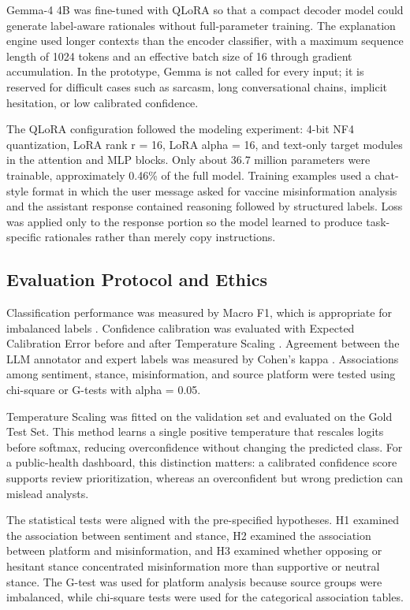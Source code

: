 \documentclass[runningheads]{llncs}
\begin{document}
Gemma-4 4B was fine-tuned with QLoRA so that a compact decoder model could generate label-aware rationales without full-parameter training. The explanation engine used longer contexts than the encoder classifier, with a maximum sequence length of 1024 tokens and an effective batch size of 16 through gradient accumulation. In the prototype, Gemma is not called for every input; it is reserved for difficult cases such as sarcasm, long conversational chains, implicit hesitation, or low calibrated confidence.

The QLoRA configuration followed the modeling experiment: 4-bit NF4 quantization, LoRA rank r = 16, LoRA alpha = 16, and text-only target modules in the attention and MLP blocks. Only about 36.7 million parameters were trainable, approximately 0.46\% of the full model. Training examples used a chat-style format in which the user message asked for vaccine misinformation analysis and the assistant response contained reasoning followed by structured labels. Loss was applied only to the response portion so the model learned to produce task-specific rationales rather than merely copy instructions.

\subsection{Evaluation Protocol and Ethics}
Classification performance was measured by Macro F1, which is appropriate for imbalanced labels \cite{he2009imbalanced}. Confidence calibration was evaluated with Expected Calibration Error before and after Temperature Scaling \cite{guo2017calibration}. Agreement between the LLM annotator and expert labels was measured by Cohen's kappa \cite{landis1977kappa}. Associations among sentiment, stance, misinformation, and source platform were tested using chi-square or G-tests with alpha = 0.05.

Temperature Scaling was fitted on the validation set and evaluated on the Gold Test Set. This method learns a single positive temperature that rescales logits before softmax, reducing overconfidence without changing the predicted class. For a public-health dashboard, this distinction matters: a calibrated confidence score supports review prioritization, whereas an overconfident but wrong prediction can mislead analysts.

The statistical tests were aligned with the pre-specified hypotheses. H1 examined the association between sentiment and stance, H2 examined the association between platform and misinformation, and H3 examined whether opposing or hesitant stance concentrated misinformation more than supportive or neutral stance. The G-test was used for platform analysis because source groups were imbalanced, while chi-square tests were used for the categorical association tables.
\end{document}
